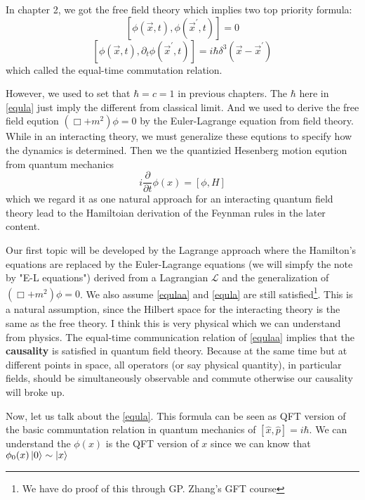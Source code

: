 \documentclass[12pt,openany]{book}
\begin{document}
     In chapter 2, we got the free field theory which implies two top priority formula:
     \begin{equation}\label{equlaa}
     	\left[\phi(\vec{x},t),\phi(\vec{x}^\prime,t)\right]=0
     \end{equation}
     \begin{equation}\label{equla}
     	\left[\phi(\vec{x},t),\partial_t\phi(\vec{x}^\prime,t)\right]=i\hbar\delta^3(\vec{x}-\vec{x}^\prime)
     \end{equation}
	 which called the equal-time commutation relation.
	 \par 
	 However, we used to set that $\hbar=c=1$ in previous chapters. The $\hbar$ here in \eqref{equla}
	 just imply the different from classical limit. And we used to derive the free field eqution $(\Box+m^2)\phi=0$ by the 
	 Euler-Lagrange equation from field theory. While in an interacting theory, we must generalize these 
	 equtions to specify how the dynamics is determined. Then we the quantizied Hesenberg motion eqution from 
	 quantum mechanics
	 \begin{equation}
	 	i\frac{\partial}{\partial t}\phi(x)=\left[\phi,H\right]
	 \end{equation}
	 which we regard it as one natural approach for an interacting quantum field theory lead to the Hamiltoian derivation
	 of the Feynman rules in the later content.
	 \par 
	 Our first topic will be developed by the Lagrange approach where the Hamilton's equations are replaced
	 by the Euler-Lagrange equations (we will simpfy the note by "E-L equations") derived from a Lagrangian $\mathcal{L}$
	 and the generalization of $(\Box+m^2)\phi=0$. We also assume \eqref{equlaa} and \eqref{equla} are still satisfied\footnote{We have do proof of this through GP. Zhang's GFT course}.
	 This is a natural assumption, since the Hilbert space for the interacting theory is the same as the free theory. 
	 I think this is very physical which we can understand from physics. The equal-time communication relation of \eqref{equlaa} implies that 
	 the \textbf{causality} is satisfied in quantum field theory. Because at the same time but at different points in space,
	 all operators (or say physical quantity), in particular fields, should be simultaneously observable and commute otherwise our 
	 causality will broke up. 
	 \par 
	 Now, let us talk about the \eqref{equla}. This formula can be seen as QFT version of the basic communtation relation in quantum mechanics
	 of $\left[\hat{x},\hat{p}\right]=i\hbar$. We can understand the $\phi(x)$ is the QFT version of $x$ since we can know that $\phi_0(x)\ket{0}\sim\ket{x}$
\end{document}
